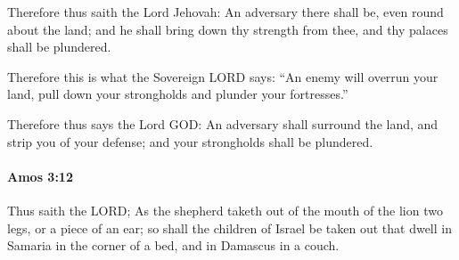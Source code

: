 			\begin{versebox}
					\item[BHS] 
					\item[LXX] 
					\item[ASV] Therefore thus saith the Lord Jehovah: An adversary there shall be, even round about the land; and he shall bring down thy strength from thee, and thy palaces shall be plundered.
					\item[NIV] Therefore this is what the Sovereign LORD says: “An enemy will overrun your land, pull down your strongholds and plunder your fortresses.”
					\item[NRSV] Therefore thus says the Lord GOD: An adversary shall surround the land, and strip you of your defense; and your strongholds shall be plundered.
			\end{versebox}

		\paragraph{Amos 3:12} %
			\label{AMOS-3-12}

			Thus saith the LORD; As the shepherd taketh out of the mouth of the lion two legs, or a piece of an ear; so shall the children of Israel be taken out that dwell in Samaria in the corner of a bed, and in Damascus in a couch.

